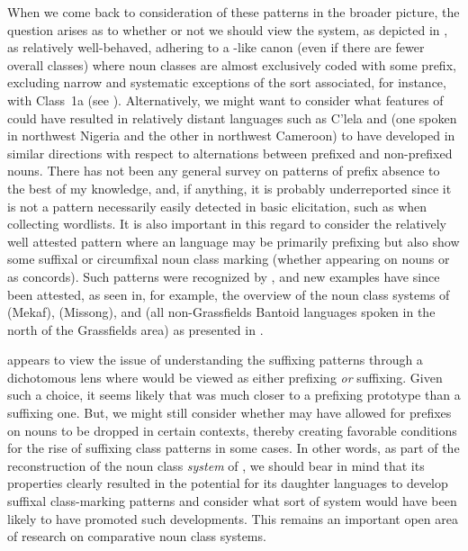 \documentclass[output=paper ,collection	  ,collectionchapter ,biblatexbackend=biber   ]{langscibook}
\begin{document}
\largerpage[-1]
When we come back to consideration of these patterns in the broader 
picture, the question arises as to whether or not we should view the
 system, as depicted in , as relatively
well-behaved, adhering to a -like canon (even if there are fewer overall
classes) where noun classes are almost exclusively coded with some prefix,
excluding narrow and systematic exceptions of the sort associated, for instance,
with  Class~1a (see ). Alternatively, we might want to
consider what features of  could have resulted in relatively
distant languages such as C'lela and  (one spoken in northwest Nigeria and
the other in northwest Cameroon) to have developed in similar directions with
respect to alternations between prefixed and non-prefixed nouns. There has not
been any general survey on patterns of prefix absence to the best of my
knowledge, and, if anything, it is probably underreported since it is not a
pattern necessarily easily detected in basic elicitation, such as when
collecting wordlists. It is also important in this regard to consider the
relatively well attested pattern where an  language may be
primarily prefixing but also show some suffixal or circumfixal noun class
marking (whether appearing on nouns or as concords). Such patterns were
recognized by , and new examples have since been
attested, as seen in, for example, the overview of the noun class systems of
 (Mekaf),  (Missong), and  (all non-Grassfields  Bantoid
languages spoken in the north of the Grassfields area) as presented in
.
 
 appears to view the issue of understanding the
suffixing patterns through a dichotomous lens where  would be
viewed as either prefixing \emph{or} suffixing. Given such a choice, it seems
likely that  was much closer to a prefixing prototype than a
suffixing one. But, we might still consider whether  may have
allowed for prefixes on nouns to be dropped in certain contexts, thereby
creating favorable conditions for the rise of suffixing class patterns in some
cases. In other words, as part of the reconstruction of the noun class
\emph{system} of , we should bear in mind that its properties
clearly resulted in the potential for its daughter languages to develop suffixal
class-marking patterns and consider what sort of system would have been likely
to have promoted such developments. This remains an important open area
of research on comparative  noun class systems.
\end{document}
